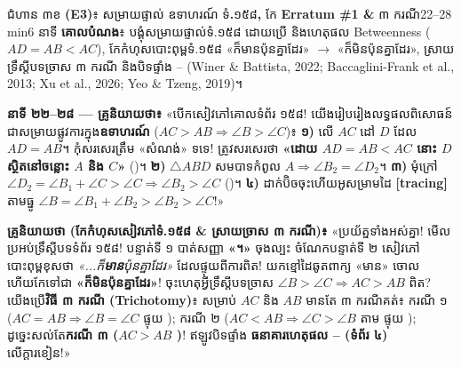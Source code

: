 \documentclass[a4paper,12pt]{article}
\newcommand{\en}[1]{{\TimesEn #1}}
\newcommand{\enbf}[1]{{\TimesEn\textbf{#1}}}
\newcommand{\cnum}[1]{{\TimesEn\fontsize{10.5pt}{12pt}\selectfont\ding{\numexpr181+#1\relax}}}
\newcommand{\tri}[1]{\ensuremath{\triangle #1}}
\newcommand{\ang}[1]{\ensuremath{\angle #1}}
\begin{document}
\Needspace{2.0cm}
\begin{phasebox}{ជំហាន ៣ខ \enbf{(E3)}៖ សម្រាយផ្ទាល់ ឧទាហរណ៍ ទំ\enbf{.}១៥៨\enbf{,} កែ \enbf{Erratum \#1 \&} ៣ ករណី}{22--28 min}{6 នាទី}
\textbf{គោលបំណង}៖ បង្គុំសម្រាយផ្ទាល់ទំ.១៥៨ ដោយប្រើ \en{[tracing]} និងហេតុផល \en{Betweenness} ($AD=AB<AC$), កែកំហុសបោះពុម្ពទំ.១៥៨ «ក៏មានប៉ុនគ្នាដែរ» $\to$ «ក៏មិនប៉ុនគ្នាដែរ», ស្រាយទ្រឹស្ដីបទច្រាស ៣ ករណី និងបិទផ្ទាំង \cnum{1}--\cnum{5} \en{(Winer \& Battista, 2022; Baccaglini-Frank et al., 2013; Xu et al., 2026; Yeo \& Tzeng, 2019)}។
\end{phasebox}
\begin{scriptbox}
  \textbf{នាទី ២២--២៨ — គ្រូនិយាយថា៖} «បើកសៀវភៅគោលទំព័រ ១៥៨! យើងរៀបរៀងលទ្ធផលពិសោធន៍ជាសម្រាយផ្លូវការក្នុង\textbf{ឧទាហរណ៍} ($AC>AB \Rightarrow \ang{B}>\ang{C}$)៖ \textbf{១)} លើ $AC$ ដៅ $D$ ដែល $AD=AB$។ កុំសរសេរត្រឹម «សំណង់» ទទេ! ត្រូវសរសេរថា \textbf{«ដោយ $AD=AB<AC$ នោះ $D$ ស្ថិតនៅចន្លោះ $A$ និង $C$»} (\cnum{4})។ \textbf{២)} $\tri{ABD}$ សមបាទកំពូល $A \Rightarrow \ang{B_2}=\ang{D_2}$។ \textbf{៣)} មុំក្រៅ $\ang{D_2}=\ang{B_1}+\ang{C}>\ang{C} \Rightarrow \ang{B_2}>\ang{C}$ (\cnum{4})។ \textbf{៤)} ដាក់ប៊ិចចុះហើយអូសម្រាមដៃ \en{\textbf{[tracing]}} តាមធ្នូ $\ang{B}=\ang{B_1}+\ang{B_2}>\ang{B_2}>\ang{C}$!»\par\vspace{2pt}
  \textbf{គ្រូនិយាយថា (កែកំហុសសៀវភៅទំ.១៥៨ \& ស្រាយច្រាស ៣ ករណី)៖} «ប្រយ័ត្នទាំងអស់គ្នា! មើលប្រអប់ទ្រឹស្ដីបទទំព័រ ១៥៨! បន្ទាត់ទី ១ បាត់សញ្ញា \textbf{«។»} ចុងល្បះ ចំណែកបន្ទាត់ទី ២ សៀវភៅបោះពុម្ពខុសថា \textit{«...ក៏\textbf{មាន}ប៉ុនគ្នាដែរ»} ដែលផ្ទុយពីការពិត! យកខ្មៅដៃឆូតពាក្យ «មាន» ចោលហើយកែទៅជា \textbf{«ក៏មិនប៉ុនគ្នាដែរ»}! ចុះហេតុអ្វីទ្រឹស្ដីបទច្រាស $\ang{B}>\ang{C} \Rightarrow AC>AB$ ពិត? យើងប្រើ\textbf{វិធី ៣ ករណី (\en{Trichotomy})}៖ សម្រាប់ $AC$ និង $AB$ មានតែ ៣ ករណីគត់៖ ករណី ១ ($AC=AB \Rightarrow \ang{B}=\ang{C}$ ផ្ទុយ ); ករណី ២ ($AC<AB \Rightarrow \ang{C}>\ang{B}$ តាម \cnum{2} ផ្ទុយ ); ដូច្នេះសល់តែ\textbf{ករណី ៣ ($AC>AB$ )}! ឥឡូវបិទផ្ទាំង \textbf{ធនាគារហេតុផល \cnum{1}--\cnum{5} (ទំព័រ ៤)} លើក្ដារខៀន!»
\end{scriptbox}
\end{document}

